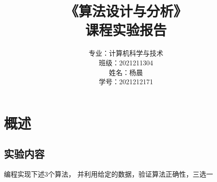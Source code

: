\documentclass[lang=cn,11pt,a4paper]{elegantpaper}
\title{《算法设计与分析》\\课程实验报告}
\author{
\huge 专业：计算机科学与技术 \\[10pt]
\huge 班级：2021211304 \\[10pt]
\huge 姓名：杨晨 \\[10pt]
\huge 学号：2021212171
}
\date{}
\begin{document}
\maketitle

\clearpage



\section{概述}

\subsection{实验内容}
编程实现下述3个算法， 并利用给定的数据，验证算法正确性，三选一
\end{document}
